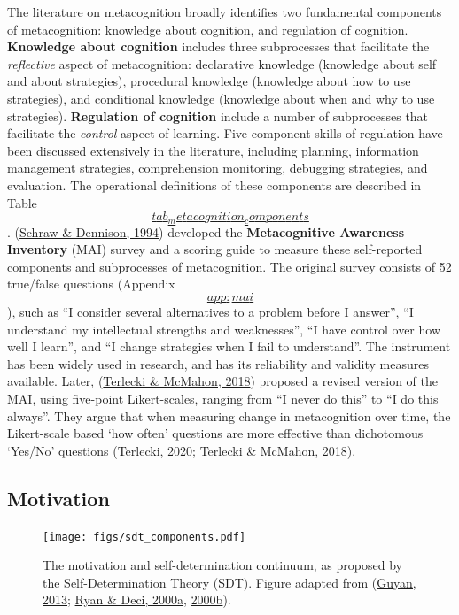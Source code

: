 \documentclass[a4paper, nobind]{templates/ociamthesis}
\begin{document}
The literature on metacognition broadly identifies two fundamental
components of metacognition: knowledge about cognition, and regulation
of cognition. \textbf{Knowledge about cognition} includes three subprocesses
that facilitate the \emph{reflective} aspect of metacognition: declarative
knowledge (knowledge about self and about strategies), procedural
knowledge (knowledge about how to use strategies), and conditional
knowledge (knowledge about when and why to use strategies). \textbf{Regulation
of cognition} include a number of subprocesses that facilitate the
\emph{control} aspect of learning. Five component skills of regulation have
been discussed extensively in the literature, including planning,
information management strategies, comprehension monitoring, debugging
strategies, and evaluation. The operational definitions of these
components are described in Table
\protect\hyperlink{tab_metacognition_components}{\[tab_metacognition_components\]}. (\protect\hyperlink{ref-schraw1994assessing}{Schraw \& Dennison, 1994})
developed the \textbf{Metacognitive Awareness Inventory} (MAI) survey and a
scoring guide to measure these self-reported components and subprocesses
of metacognition. The original survey consists of 52 true/false
questions (Appendix \protect\hyperlink{app:mai}{\[app:mai\]}), such as ``I consider several alternatives to a
problem before I answer'', ``I understand my intellectual strengths and
weaknesses'', ``I have control over how well I learn'', and ``I change
strategies when I fail to understand''. The instrument has been widely
used in research, and has its reliability and validity measures
available. Later, (\protect\hyperlink{ref-terlecki2018call}{Terlecki \& McMahon, 2018}) proposed a revised version of the
MAI, using five-point Likert-scales, ranging from ``I never do this'' to
``I do this always''. They argue that when measuring change in
metacognition over time, the Likert-scale based `how often' questions
are more effective than dichotomous `Yes/No' questions
(\protect\hyperlink{ref-terlecki2020revising}{Terlecki, 2020}; \protect\hyperlink{ref-terlecki2018call}{Terlecki \& McMahon, 2018}).

\hypertarget{motivation}{%
\subsection{Motivation}\label{motivation}}

\begin{figure}
\hypertarget{fig_sdt_components}{%
\centering
\texttt{[image: figs/sdt\_components.pdf]}
\caption{The motivation and self-determination continuum, as proposed by the
Self-Determination Theory (SDT). Figure adapted from
(\protect\hyperlink{ref-guyan2013improving}{Guyan, 2013}; \protect\hyperlink{ref-ryan2000intrinsic}{Ryan \& Deci, 2000a}, \protect\hyperlink{ref-ryan2000self}{2000b}).}\label{fig_sdt_components}
}
\end{figure}
\end{document}
